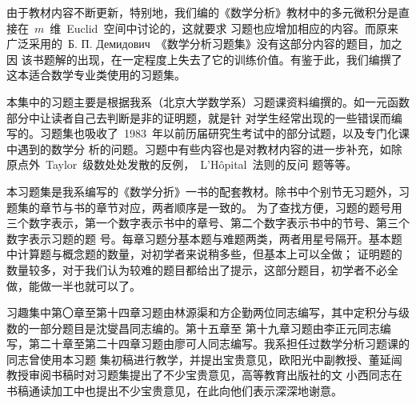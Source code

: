 
\begin{preface}

由于教材内容不断更新，特别地，我们编的《数学分析》教材中的多元微积分是直接在~$m$~维~Euclid~空间中讨论的，这就要求
习题也应增加相应的内容。而原来广泛采用的~Б. П. Демидович~《数学分析习题集》没有这部分内容的题目，加之因
该书题解的出现，在一定程度上失去了它的训练价值。有鉴于此，我们编撰了这本适合数学专业类使用的习题集。

本集中的习题主要是根据我系（北京大学数学系）习题课资料编撰的。如一元函数部分中让读者自己去判断是非的证明题，就是针
对学生经常出现的一些错误而编写的。习题集也吸收了~1983~年以前历届研究生考试中的部分试题，以及专门化课中遇到的数学分
析的问题。习题中有些内容也是对教材内容的进一步补充，如除原点外~Taylor~级数处处发散的反例，~L'H\^opital~法则的反问
题等等。

本习题集是我系编写的《数学分折》一书的配套教材。除书中个别节无习题外，习题集的章节与书的章节对应，两者顺序是一致的。%
为了查找方便，习题的题号用三个数字表示，第一个数字表示书中的章号、第二个数字表示书中的节号、第三个数字表示习题的题
号。每章习题分基本题与难题两类，两者用星号隔开。基本题中计算题与概念题的数量，对初学者来说稍多些，但基本上可以全做；%
证明题的数量较多，对于我们认为较难的题目都给出了提示，这部分题目，初学者不必全做，能做一半也就可以了。

习趣集中第〇章至第十四章习题由林源渠和方企勤两位同志编写，其中定积分与级数的一部分题目是沈燮昌同志编的。第十五章至
第十九章习题由李正元同志编写，第二十章至第二十四章习题由廖可人同志编写。我系担任过数学分析习题课的同志曾使用本习题
集初稿进行教学，并提出宝贵意见，欧阳光中副教授、董延闿教授审阅书稿时对习题集提出了不少宝贵意见，高等教育出版社的文
小西同志在书稿通读加工中也提出不少宝贵意见，在此向他们表示深深地谢意。

\end{preface}

\endinput

